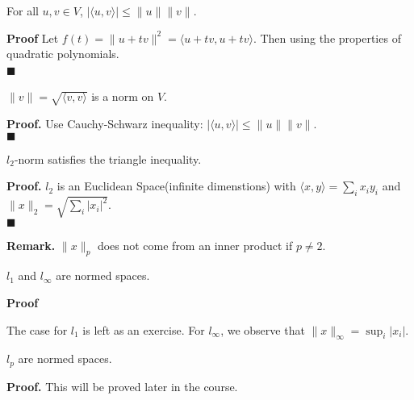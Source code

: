 \documentclass[main.tex]{subfiles}
\begin{document}
\begin{theorem}
    For all $u, v \in V$, $|\langle u, v \rangle| \le \|u\|\|v\|$.
\end{theorem}
\par \noindent \textbf{Proof} Let $f(t) = \|u + tv\|^2 = \langle u + tv, u + tv \rangle$. Then using the properties of quadratic polynomials. 
\\ \null \hfill $\blacksquare$ \
\begin{property}
    $\|v\| = \sqrt{\langle v, v \rangle}$ is a norm on $V$. 
\end{property}

\par \noindent \textbf{Proof. } Use Cauchy-Schwarz inequality: $|\langle u, v \rangle| \le \|u\|\|v\|$.
\\ \null \hfill $\blacksquare$ 
\begin{corollary}
    $l_2$-norm satisfies the triangle inequality. 
\end{corollary}

\par \noindent \textbf{Proof. } $l_2$ is an Euclidean Space(infinite dimenstions) with $\langle x, y \rangle = \sum_i x_i y_i$ and $\|x\|_2 = \sqrt{\sum_i |x_i|^2}$. 
\\ \null \hfill $\blacksquare$ 
\par \noindent \textbf{Remark. } $\|x\|_p$ does not come from an inner product if $p \neq 2$. 

\begin{theorem}
    $l_1$ and $l_{\infty}$ are normed spaces.   
\end{theorem}

\par \noindent \textbf{Proof} 
\par The case for $l_1$ is left as an exercise. For $l_{\infty}$, we observe that $\|x\|_{\infty} = \sup_i |x_i|$.

\begin{theorem}
    $l_p$ are normed spaces. 
\end{theorem}
\par \noindent \textbf{Proof. } This will be proved later in the course.
\end{document}

